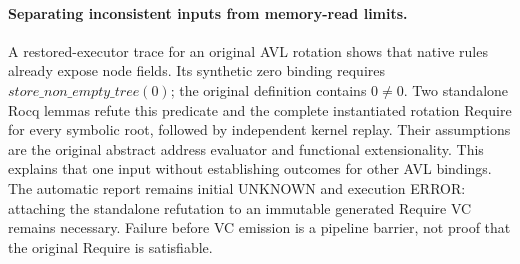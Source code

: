 \paragraph{Separating inconsistent inputs from memory-read limits.}
A restored-executor trace for an original AVL rotation shows that native rules
already expose node fields. Its synthetic zero binding requires
$store\_non\_empty\_tree(0)$; the original definition contains $0\ne0$.
Two standalone Rocq lemmas refute this predicate and the complete instantiated
rotation Require for every symbolic root, followed by independent kernel replay.
Their assumptions are the original abstract address evaluator and functional
extensionality. This explains that one input without establishing outcomes for
other AVL bindings. The automatic report remains initial UNKNOWN and execution
ERROR: attaching the standalone refutation to an immutable generated Require
VC remains necessary. Failure before VC emission is a pipeline barrier, not
proof that the original Require is satisfiable.

